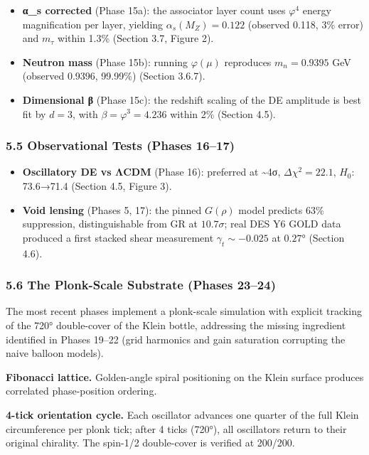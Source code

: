 \documentclass[
]{article}
\providecommand{\tightlist}{%
  \setlength{\itemsep}{0pt}\setlength{\parskip}{0pt}}
\begin{document}
\begin{itemize}
\tightlist
\item
  \textbf{α\_s corrected} (Phase 15a): the associator layer count uses
  \(\varphi^4\) energy magnification per layer, yielding
  \(\alpha_s(M_Z) = 0.122\) (observed 0.118, 3\% error) and \(m_\tau\)
  within 1.3\% (Section 3.7, Figure 2).
\item
  \textbf{Neutron mass} (Phase 15b): running \(\varphi(\mu)\) reproduces
  \(m_n = 0.9395\) GeV (observed 0.9396, 99.99\%) (Section 3.6.7).
\item
  \textbf{Dimensional β} (Phase 15c): the redshift scaling of the DE
  amplitude is best fit by \(d = 3\), with \(\beta = \varphi^3 = 4.236\)
  within 2\% (Section 4.5).
\end{itemize}

\subsubsection{5.5 Observational Tests (Phases
16--17)}\label{observational-tests-phases-1617}

\begin{itemize}
\tightlist
\item
  \textbf{Oscillatory DE vs ΛCDM} (Phase 16): preferred at
  \textasciitilde4σ, \(\Delta\chi^2 = 22.1\), \(H_0\): 73.6→71.4
  (Section 4.5, Figure 3).
\item
  \textbf{Void lensing} (Phases 5, 17): the pinned \(G(\rho)\) model
  predicts 63\% suppression, distinguishable from GR at \(10.7\sigma\);
  real DES Y6 GOLD data produced a first stacked shear measurement
  \(\gamma_t \sim -0.025\) at \(0.27°\) (Section 4.6).
\end{itemize}

\subsubsection{5.6 The Plonk-Scale Substrate (Phases
23--24)}\label{the-plonk-scale-substrate-phases-2324}

The most recent phases implement a plonk-scale simulation with explicit
tracking of the 720° double-cover of the Klein bottle, addressing the
missing ingredient identified in Phases 19--22 (grid harmonics and gain
saturation corrupting the naive balloon models).

\textbf{Fibonacci lattice.} Golden-angle spiral positioning on the Klein
surface produces correlated phase-position ordering.

\textbf{4-tick orientation cycle.} Each oscillator advances one quarter
of the full Klein circumference per plonk tick; after 4 ticks (720°),
all oscillators return to their original chirality. The spin-1/2
double-cover is verified at 200/200.
\end{document}

